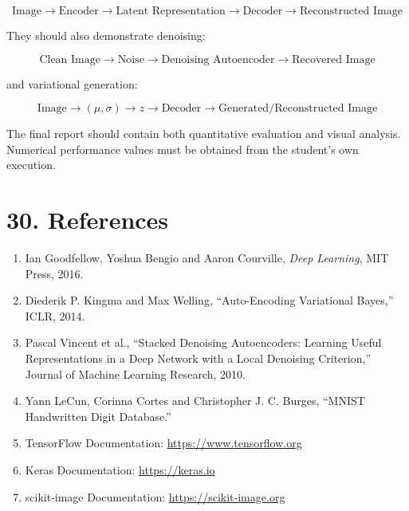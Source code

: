 \documentclass[10pt]{article}
\begin{document}
\[
\boxed{
\text{Image}
\rightarrow
\text{Encoder}
\rightarrow
\text{Latent Representation}
\rightarrow
\text{Decoder}
\rightarrow
\text{Reconstructed Image}
}
\]

They should also demonstrate denoising:

\[
\boxed{
\text{Clean Image}
\rightarrow
\text{Noise}
\rightarrow
\text{Denoising Autoencoder}
\rightarrow
\text{Recovered Image}
}
\]

and variational generation:

\[
\boxed{
\text{Image}
\rightarrow
(\mu,\sigma)
\rightarrow
z
\rightarrow
\text{Decoder}
\rightarrow
\text{Generated/Reconstructed Image}
}
\]

The final report should contain both quantitative evaluation and visual
analysis. Numerical performance values must be obtained from the student's
own execution.

\section*{30. References}

\begin{enumerate}
\item Ian Goodfellow, Yoshua Bengio and Aaron Courville,
\emph{Deep Learning}, MIT Press, 2016.

\item Diederik P. Kingma and Max Welling,
``Auto-Encoding Variational Bayes,'' ICLR, 2014.

\item Pascal Vincent et al.,
``Stacked Denoising Autoencoders: Learning Useful Representations in a Deep
Network with a Local Denoising Criterion,'' Journal of Machine Learning
Research, 2010.

\item Yann LeCun, Corinna Cortes and Christopher J. C. Burges,
``MNIST Handwritten Digit Database.''

\item TensorFlow Documentation:
\url{https://www.tensorflow.org}

\item Keras Documentation:
\url{https://keras.io}

\item scikit-image Documentation:
\url{https://scikit-image.org}
\end{enumerate}
\end{document}
